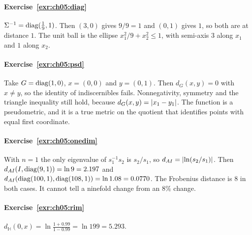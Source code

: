 
\paragraph{Exercise~\ref{exr:ch05:diag}}
$\Sigma^{-1}=\operatorname{diag}(\tfrac19,1)$. Then $(3,0)$ gives $9/9=1$ and $(0,1)$ gives $1$, so both are at distance $1$. The unit ball is the ellipse $x_1^2/9+x_2^2\le1$, with semi-axis $3$ along $x_1$ and $1$ along $x_2$.

\paragraph{Exercise~\ref{exr:ch05:psd}}
Take $G=\operatorname{diag}(1,0)$, $x=(0,0)$ and $y=(0,1)$. Then $d_G(x,y)=0$ with $x\ne y$, so the identity of indiscernibles fails. Nonnegativity, symmetry and the triangle inequality still hold, because $d_G(x,y)=\lvert x_1-y_1\rvert$. The function is a pseudometric, and it is a true metric on the quotient that identifies points with equal first coordinate.

\paragraph{Exercise~\ref{exr:ch05:onedim}}
With $n=1$ the only eigenvalue of $s_1^{-1}s_2$ is $s_2/s_1$, so $d_{AI}=\lvert \ln(s_2/s_1)\rvert$. Then $d_{AI}(I,\operatorname{diag}(9,1))=\ln9=2.197$ and $d_{AI}(\operatorname{diag}(100,1),\operatorname{diag}(108,1))=\ln1.08=0.0770$. The Frobenius distance is $8$ in both cases. It cannot tell a ninefold change from an $8\%$ change.

\paragraph{Exercise~\ref{exr:ch05:rim}}
$d_{\mathbb H}(0,x)=\ln\frac{1+0.99}{1-0.99}=\ln199=5.293$.

